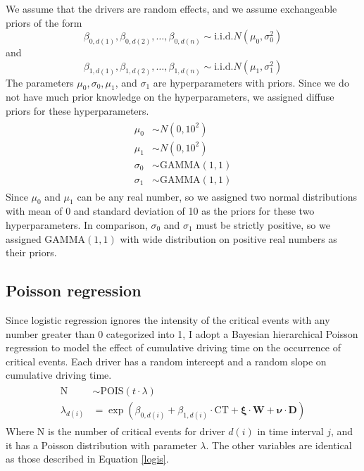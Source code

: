 \documentclass[12pt]{book}
\numberwithin{equation}{chapter}
\begin{document}
We assume that the drivers are random effects, and we assume exchangeable priors of the form
\[
\beta_{0, d(1)}, \beta_{0, d(2)}, \ldots , \beta_{0, d(n)} \sim \text{i.i.d.} N(\mu_0,\sigma_0^2)
\]
and
\[
\beta_{1, d(1)}, \beta_{1, d(2)}, \ldots , \beta_{1, d(n)} \sim \text{i.i.d.} N(\mu_1,\sigma_1^2)
\]
The parameters \(\mu_0, \sigma_0, \mu_1\), and \(\sigma_1\) are hyperparameters with priors. Since we do not have much prior knowledge on the hyperparameters, we assigned diffuse priors for these hyperparameters.
\begin{align}
    \label{prior}
    \begin{split}
        \mu_0 & \sim N(0, 10^2)\\
        \mu_1 & \sim N(0, 10^2)\\
        \sigma_0 & \sim \text{GAMMA}(1, 1)\\
        \sigma_1 & \sim \text{GAMMA}(1, 1)
    \end{split}
\end{align}
Since \(\mu_0\) and \(\mu_1\) can be any real number, so we assigned two normal distributions with mean of 0 and standard deviation of 10 as the priors for these two hyperparameters. In comparison, \(\sigma_0\) and \(\sigma_1\) must be strictly positive, so we assigned GAMMA\((1, 1)\) with wide distribution on positive real numbers as their priors.

\hypertarget{poisson-regression}{%
\subsection{Poisson regression}\label{poisson-regression}}

Since logistic regression ignores the intensity of the critical events with any number greater than 0 categorized into 1, I adopt a Bayesian hierarchical Poisson regression to model the effect of cumulative driving time on the occurrence of critical events. Each driver has a random intercept and a random slope on cumulative driving time.
\begin{align}
\label{pois}
\begin{split}
\text{N} & \sim \text{POIS}(t\cdot\lambda)\\
\lambda_{d(i)} & =\exp(\beta_{0, d(i)} + \beta_{1, d(i)} \cdot \text{CT} + \mathbf{\xi} \cdot \mathbf{W} + \mathbf{\nu} \cdot \mathbf{D})
\end{split}
\end{align}
Where N is the number of critical events for driver \(d(i)\) in time interval \(j\), and it has a Poisson distribution with parameter \(\lambda\). The other variables are identical as those described in Equation \ref{logis}.
\end{document}
